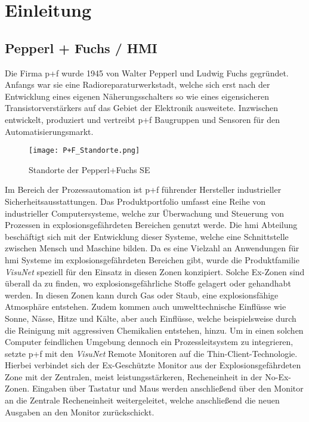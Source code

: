 \chapter{Einleitung}

\section{Pepperl + Fuchs / HMI}\label{sec:PFHMI}
Die Firma \ac{p+f} wurde 1945 von Walter Pepperl und Ludwig Fuchs gegründet. Anfangs war sie eine Radioreparaturwerkstadt, welche sich erst nach der Entwicklung eines eigenen Näherungsschalters so wie eines eigensicheren Transistorverstärkers auf das Gebiet der Elektronik ausweitete. Inzwischen entwickelt, produziert und vertreibt \ac{p+f} Baugruppen und Sensoren für den Automatisierungsmarkt. \cite{PFGeschichte}\\
\vspace{-1cm}
\begin{flushleft}
    \begin{figure}[h!]
        \centering
        \texttt{[image: P+F\_Standorte.png]}
        \caption{Standorte der Pepperl+Fuchs SE}
        \label{fig:StandortePF}
    \end{figure}
\end{flushleft}
Im Bereich der Prozessautomation ist \ac*{p+f} führender Hersteller industrieller Sicherheitsausstattungen. Das Produktportfolio umfasst eine Reihe von industrieller Computersysteme, welche zur Überwachung und Steuerung von Prozessen in explosionsgefährdeten Bereichen genutzt werde. Die \ac{hmi} Abteilung beschäftigt sich mit der Entwicklung dieser Systeme, welche eine Schnittstelle zwischen Mensch und Maschine bilden. Da es eine Vielzahl an Anwendungen für \ac{hmi} Systeme im explosionsgefährdeten Bereichen gibt, wurde die Produktfamilie \textit{VisuNet} speziell für den Einsatz in diesen Zonen konzipiert. Solche Ex-Zonen sind überall da zu finden, wo explosionsgefährliche Stoffe gelagert oder gehandhabt werden. In diesen Zonen kann durch Gas oder Staub, eine explosionsfähige Atmosphäre entstehen. Zudem kommen auch umwelttechnische Einflüsse wie Sonne, Nässe, Hitze und Kälte, aber auch Einflüsse, welche beispielsweise durch die Reinigung mit aggressiven Chemikalien entstehen, hinzu. Um in einen solchen Computer feindlichen Umgebung dennoch ein Prozessleitsystem zu integrieren, setzte \ac{p+f} mit den \textit{VisuNet} Remote Monitoren auf die Thin-Client-Technologie. Hierbei verbindet sich der Ex-Geschützte Monitor aus der Explosionsgefährdeten Zone mit der Zentralen, meist leistungsstärkeren, Recheneinheit in der No-Ex-Zonen. Eingaben über Tastatur und Maus werden anschließend über den Monitor an die Zentrale Recheneinheit weitergeleitet, welche anschließend die neuen Ausgaben an den Monitor zurückschickt. \cite{HMIYannick}

